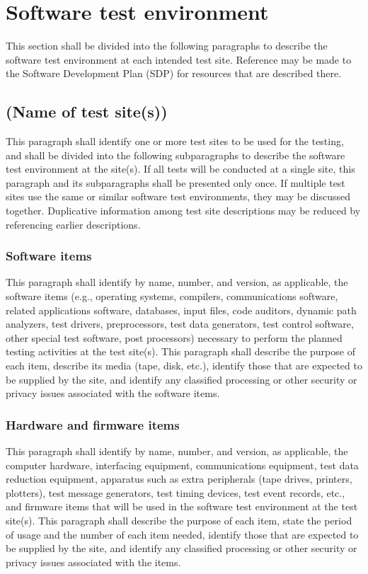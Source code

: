 \section{Software test environment}

This section shall be divided into the following paragraphs to describe
the software test environment at each intended test site. Reference may
be made to the Software Development Plan (SDP) for resources that are
described there.

\subsection{(Name of test site(s))}

This paragraph shall identify one or more test sites to be used for the
testing, and shall be divided into the following subparagraphs to
describe the software test environment at the site(s). If all tests will
be conducted at a single site, this paragraph and its subparagraphs
shall be presented only once. If multiple test sites use the same or
similar software test environments, they may be discussed together.
Duplicative information among test site descriptions may be reduced by
referencing earlier descriptions.

\subsubsection{Software items}

This paragraph shall identify by name, number, and version, as
applicable, the software items (e.g., operating systems, compilers,
communications software, related applications software, databases, input
files, code auditors, dynamic path analyzers, test drivers,
preprocessors, test data generators, test control software, other
special test software, post processors) necessary to perform the planned
testing activities at the test site(s). This paragraph shall describe
the purpose of each item, describe its media (tape, disk, etc.),
identify those that are expected to be supplied by the site, and
identify any classified processing or other security or privacy issues
associated with the software items.

\subsubsection{Hardware and firmware items}

This paragraph shall identify by name, number, and version, as
applicable, the computer hardware, interfacing equipment, communications
equipment, test data reduction equipment, apparatus such as extra
peripherals (tape drives, printers, plotters), test message generators,
test timing devices, test event records, etc., and firmware items that
will be used in the software test environment at the test site(s). This
paragraph shall describe the purpose of each item, state the period of
usage and the number of each item needed, identify those that are
expected to be supplied by the site, and identify any classified
processing or other security or privacy issues associated with the
items.

